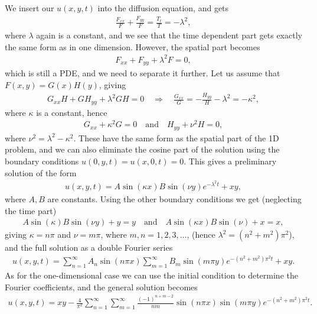\documentclass[12pt, a4paper]{article}
\begin{document}
We insert our $u(x,y,t)$ into the diffusion equation, and gets 
\begin{align*}
\frac{F_{xx}}{F} + \frac{F_{yy}}{F} = \frac{T_t}{T} = -\lambda^2, 
\end{align*}
where $\lambda$ again is a constant, and we see that the time dependent part gets exactly the same 
form as in one dimension. However, the spatial part becomes
\begin{align*}
F_{xx} + F_{yy} + \lambda^2 F = 0, 
\end{align*}
which is still a PDE, and we need to separate it further. Let us assume that $F(x,y) = G(x)H(y)$, giving 
\begin{align*}
G_{xx} H + G H_{yy} + \lambda^2 GH = 0 \quad \Rightarrow \quad 
\frac{G_{xx}}{G} = -  \frac{H_{yy}}{H} - \lambda^2  = -\kappa^2,  
\end{align*}
where $\kappa$ is a constant, hence 
\begin{align*}
G_{xx} + \kappa^2 G = 0 \quad \text{and} \quad H_{yy} + \nu^2 H = 0, 
\end{align*}
where $\nu^2 = \lambda^2 - \kappa^2$. These have the same form as the spatial part of the 1D problem, 
and we can also eliminate the cosine part of the solution using the boundary conditions 
$u(0,y,t) = u(x,0,t) = 0$. This gives a preliminary solution of the form 
\begin{align*}
u(x,y,t) = A \sin(\kappa x) B \sin (\nu y ) e^{-\lambda^2 t} + xy,  
\end{align*}  
where $A,B$ are constants. Using the other boundary conditions we get (neglecting the time part) 
\begin{align*}
A \sin(\kappa)B\sin(\nu y) + y = y \quad \text{and} \quad A \sin(\kappa x)B\sin(\nu ) + x = x, 
\end{align*}
giving $\kappa = n \pi$ and $\nu = m\pi$, where $m,n=1,2,3,\dots$, (hence $\lambda^2 = (n^2 + m^2)\pi^2$), 
and the full solution as a double Fourier series 
\begin{align*}
u(x,y,t) = \sum_{n=1}^\infty A_n \sin(n\pi x) \sum_{m=1}^\infty B_m \sin(m\pi y) e^{-(n^2 +m^2)\pi^2 t}+xy.  
\end{align*} 
As for the one-dimensional case we can use the initial condition to determine the Fourier coefficients, 
and the general solution becomes 
\begin{align*}
u(x,y,t) = xy - \frac{4}{\pi^2} \sum_{n=1}^\infty \sum_{m=1}^\infty 
							 	\frac{(-1)^{n+m-2}}{nm} \sin(n\pi x)  \sin(m\pi y) e^{-(n^2 +m^2)\pi^2 t}.
\end{align*} 
\end{document}
